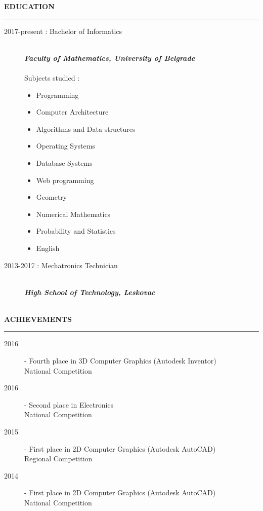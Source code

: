 \documentclass{article}
\begin{document}
\color{my_col}
\textbf{\large EDUCATION}\\
\noindent\rule{15.4cm}{1.6pt}\color{black}
\begin{description}
    \item[ 2017-present : Bachelor of Informatics ]\hfill \\
    \textbf{\textit{Faculty of Mathematics, University of Belgrade}}\\
    \normalsize \\
    Subjects studied :
     \begin{multicols}{2}
    \begin{itemize}
    \item Programming
    \item Computer Architecture
    \item Algorithms and Data structures
    \item Operating Systems
    \item Database Systems
    \item Web programming
    \item Geometry
    \item Numerical Mathematics
    \item Probability and Statistics 
    \item English
    \end{itemize}
    \end{multicols}
\end{description}

\begin{description}
    \item[ 2013-2017 : Mechatronics Technician]\hfill \\
    \textbf{\textit{High School of Technology, Leskovac}}\\
    \normalsize \\
  
\end{description}
\color{my_col}
\textbf{\large ACHIEVEMENTS}\\
\noindent\rule{15.4cm}{1.6pt}\color{black}
\normalsize

\begin{description}
	\item[ 2016] - Fourth place in 3D Computer Graphics (Autodesk Inventor)\\
	National Competition
	\item[ 2016] - Second place in Electronics\\
	National Competition
	\item[ 2015] - First place in 2D Computer Graphics (Autodesk AutoCAD)\\
	Regional Competition
	\item[ 2014] - First place in 2D Computer Graphics (Autodesk AutoCAD)\\
	National Competition
\end{description}
\end{document}
